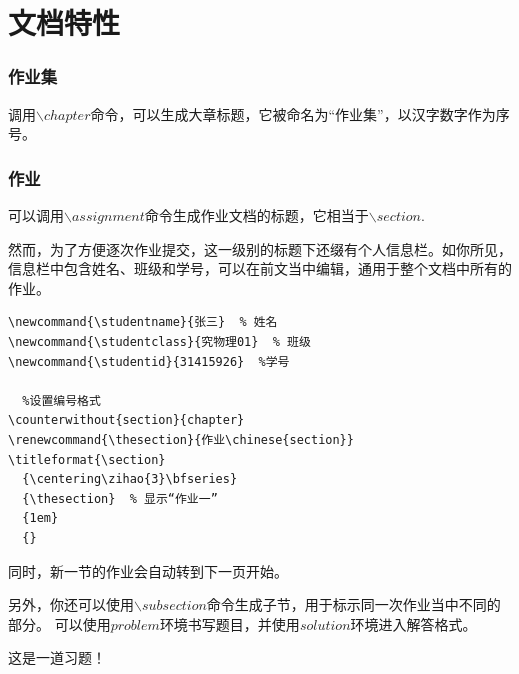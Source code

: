 \documentclass{template}
\begin{document}
\maketitle
\newpage
\thispagestyle{empty}
\null
\newpage 
\addtocounter{page}{-2}
\tableofcontents
\newpage
\thispagestyle{empty}
\null
\newpage 
{}
\chapter{文档特性}
\newpage
{}
\subsection{作业集}
调用$\backslash chapter$命令，可以生成大章标题，它被命名为“作业集”，以汉字数字作为序号。
\subsection{作业}
可以调用$\backslash assignment$命令生成作业文档的标题，它相当于$\backslash section$.

然而，为了方便逐次作业提交，这一级别的标题下还缀有个人信息栏。如你所见，信息栏中包含姓名、班级和学号，可以在前文当中编辑，通用于整个文档中所有的作业。
\begin{lstlisting}[title=\ ,frame=single]
  %个人信息设置
\newcommand{\studentname}{张三}  % 姓名
\newcommand{\studentclass}{究物理01}  % 班级
\newcommand{\studentid}{31415926}  %学号

  %设置编号格式
\counterwithout{section}{chapter}
\renewcommand{\thesection}{作业\chinese{section}}
\titleformat{\section}
  {\centering\zihao{3}\bfseries}
  {\thesection}  % 显示“作业一”
  {1em}
  {}
\end{lstlisting}

同时，新一节的作业会自动转到下一页开始。

另外，你还可以使用$\backslash subsection$命令生成子节，用于标示同一次作业当中不同的部分。
可以使用$problem$环境书写题目，并使用$solution$环境进入解答格式。
\begin{problem}
    这是一道习题！
\end{problem}
\end{document}
